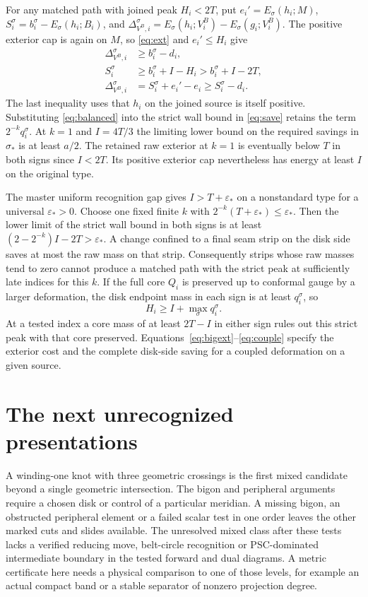 \documentclass[11pt,letterpaper]{article}
\numberwithin{equation}{section}
\theoremstyle{remark}
\begin{document}
For any matched path with joined peak \(H_i<2T\),
put \(e_i'=E_\sigma(h_i;M)\),
\(S_i^\sigma=b_i^\sigma-E_\sigma(h_i;B_i)\),
and
\(\Delta_{V^B,i}^\sigma
   =E_\sigma(h_i;V_i^B)-E_\sigma(g_i;V_i^B)\).
The positive exterior cap is again on \(M\),
so \eqref{eq:ext} and \(e_i'\le H_i\) give
\begin{align}
 \Delta_{V^B,i}^\sigma&\ge b_i^\sigma-d_i,\label{eq:bigext}\\
 S_i^\sigma&\ge b_i^\sigma+I-H_i
                   > b_i^\sigma+I-2T,\label{eq:save}\\
 \Delta_{V^B,i}^\sigma&=S_i^\sigma+e_i'-e_i
                   \ge S_i^\sigma-d_i.\label{eq:couple}
\end{align}
The last inequality uses that \(h_i\) on the joined
source is itself positive. Substituting
\eqref{eq:balanced} into the strict wall bound in
\eqref{eq:save} retains the term \(2^{-k}q_i^\sigma\).
At \(k=1\) and \(I=4T/3\) the limiting lower bound
on the required savings in \(\sigma_*\) is at least
\(a/2\). The retained raw exterior at \(k=1\)
is eventually below \(T\) in both signs since
\(I<2T\). Its positive exterior cap nevertheless
has energy at least \(I\) on the original type.

The master uniform recognition gap gives
\(I>T+\varepsilon_*\) on a nonstandard type for a
universal \(\varepsilon_*>0\). Choose one fixed
finite \(k\) with \(2^{-k}(T+\varepsilon_*)\le
\varepsilon_*\). Then the lower limit of the
strict wall bound in both signs is at least
\((2-2^{-k})I-2T>\varepsilon_*\).
A change confined to a final seam strip on the
disk side saves at most the raw mass on that strip.
Consequently strips whose raw masses tend to zero
cannot produce a matched path with the strict
peak at sufficiently late indices for this \(k\).
If the full core \(Q_i\) is preserved up to conformal
gauge by a larger deformation, the disk endpoint
mass in each sign is at least \(q_i^\sigma\), so
\[
 H_i\ge I+\max_\sigma q_i^\sigma .
\]
At a tested index a core mass of at least \(2T-I\)
in either sign rules out this strict peak with that
core preserved. Equations~\eqref{eq:bigext}--\eqref{eq:couple}
specify the exterior cost and the complete disk-side
saving for a coupled deformation on a given source.

\section{The next unrecognized presentations}\label{sec:open}
A winding-one knot with three geometric crossings is
the first mixed candidate beyond a single geometric
intersection. The bigon and peripheral arguments require
a chosen disk or control of a particular meridian.
A missing bigon, an obstructed peripheral element or a
failed scalar test in one order leaves the other marked
cuts and slides available. The unresolved mixed class
after these tests lacks a verified reducing move,
belt-circle recognition or PSC-dominated intermediate
boundary in the tested forward and dual diagrams.
A metric certificate here needs a physical comparison
to one of those levels, for example an actual compact
band or a stable separator of nonzero projection degree.
\end{document}
